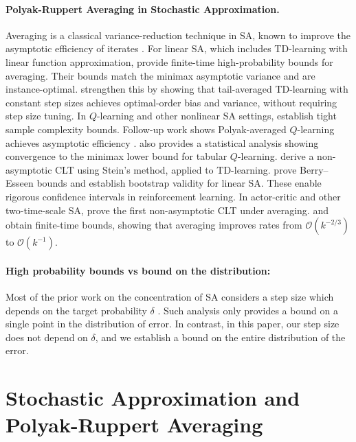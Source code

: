 \documentclass[letterpaper, 10 pt]{article}
\begin{document}
\paragraph{Polyak-Ruppert Averaging in Stochastic Approximation.}
Averaging is a classical variance-reduction technique in SA, known to improve the asymptotic efficiency of iterates \cite{polyak1992acceleration}. For linear SA, which includes TD-learning with linear function approximation, \cite{DurmusMOR2024} provide finite-time high-probability bounds for averaging. Their bounds match the minimax asymptotic variance and are instance-optimal. \cite{samsonov2024improved} strengthen this by showing that tail-averaged TD-learning with constant step sizes achieves optimal-order bias and variance, without requiring step size tuning. In $Q$-learning and other nonlinear SA settings, \cite{li2024isqlearning} establish tight sample complexity bounds. Follow-up work shows Polyak-averaged $Q$-learning achieves asymptotic efficiency \cite{li2023polyak}. \cite{li2023polyak} also provides a statistical analysis showing convergence to the minimax lower bound for tabular $Q$-learning. \cite{srikant2024clt} derive a non-asymptotic CLT using Stein’s method, applied to TD-learning. \cite{samsonov2024gaussian} prove Berry–Esseen bounds and establish bootstrap validity for linear SA. These enable rigorous confidence intervals in reinforcement learning. In actor-critic and other two-time-scale SA, \cite{kong2024nonasymptotic} prove the first non-asymptotic CLT under averaging. \cite{chandak2024finite} and \cite{chandak2025finite} obtain finite-time bounds, showing that averaging improves rates from $\mathcal{O}(k^{-2/3})$ to $\mathcal{O}(k^{-1})$. 

\paragraph{High probability bounds vs bound on the distribution: } Most of the prior work on the concentration of SA considers a step size which depends on the target probability $\delta$ \cite{li2023polyak, samsonov2024improved, li2024isqlearning}. Such analysis only provides a bound on a single point in the distribution of error. In contrast, in this paper, our step size does not depend on $\delta$, and we establish a bound on the entire distribution of the error.

\section{Stochastic Approximation and Polyak-Ruppert Averaging}
\end{document}
